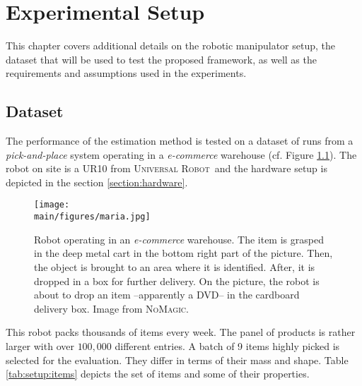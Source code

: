 \documentclass[/home/francois/latex/report/main.tex]{subfiles}
\begin{document}
\chapter{Experimental Setup}
\label{chapter:setup}

This chapter covers additional details on the robotic manipulator setup, the dataset that will be used to test the proposed framework, as well as the requirements and assumptions used in the experiments.

\section{Dataset}

The performance of the estimation method is tested on a dataset of runs from a \textit{pick-and-place} system operating in a \textit{e-commerce} warehouse (cf. Figure \ref{fig:setup:maria}). The robot on site is a UR10 from \textsc{Universal Robot}\texttrademark \ and the hardware setup is depicted in the section \ref{section:hardware}.

\begin{figure}[h]
  \centering
  \texttt{[image: \\main/figures/maria.jpg]}
  \caption{Robot operating in an \textit{e-commerce} warehouse. The item is grasped in the deep metal cart in the bottom right part of the picture. Then, the object is brought to an area where it is identified. After, it is dropped in a box for further delivery. On the picture, the robot is about to drop an item –apparently a DVD– in the cardboard delivery box. Image from \textsc{NoMagic}.}
  \label{fig:setup:maria}
\end{figure}

This robot packs thousands of items every week. The panel of products is rather larger with over $100{,}000$ different entries. A batch of 9 items highly picked is selected for the evaluation. They differ in terms of their mass and shape. Table \ref{tab:setup:items} depicts the set of items and some of their  properties.
\end{document}
